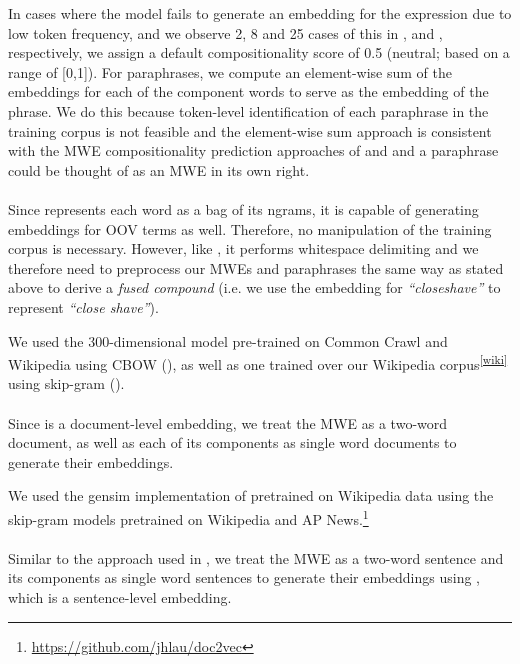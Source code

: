 In cases where the model fails to generate an embedding for the expression due to low token frequency, and we observe 2, 8 and 25 cases of this in \reddy, \ramisch and \discoj, respectively, we assign a default compositionality score of 0.5 (neutral; based on a range of [0,1]). For paraphrases, we compute an element-wise sum of the embeddings for each of the component words to serve as the embedding of the phrase. We do this because token-level identification of each paraphrase in the training corpus is not feasible and the element-wise sum approach is consistent with the MWE compositionality prediction approaches of \cite{Salehi2015} and \cite{Reddy2011} and a paraphrase could be thought of as an MWE in its own right.

\paragraph{\fasttext}
Since \fasttext represents each word as a bag of its ngrams, it is capable of generating embeddings for OOV terms as well. Therefore, no manipulation of the training corpus is necessary. However, like \wordtovec, it performs whitespace delimiting and we therefore need to preprocess our MWEs and paraphrases the same way as stated above to derive a \textit{fused compound} (i.e. we use the embedding for \textit{``closeshave''} to represent \textit{``close shave''}).

We used the 300-dimensional \fasttext model pre-trained on Common Crawl and Wikipedia using CBOW (\fasttextpre), as well as one trained over our Wikipedia corpus\textsuperscript{\ref{wiki}} using skip-gram (\fasttext).

\paragraph{\doctovec}
Since \doctovec is a document-level embedding, we treat the MWE as a two-word document, as well as each of its components as single word documents to generate their embeddings.

We used the gensim implementation of \doctovec pretrained on Wikipedia data using the \wordtovec skip-gram models pretrained on Wikipedia and AP News.\footnote{\url{https://github.com/jhlau/doc2vec}}

\paragraph{\infersent}
Similar to the approach used in \doctovec, we treat the MWE as a two-word sentence and its components as single word sentences to generate their embeddings using \infersent, which is a sentence-level embedding.

